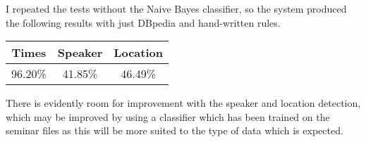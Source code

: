 \documentclass[10pt]{article}
\begin{document}
\begin{multicols}{2}
I repeated the tests without the Naive Bayes classifier, so the system produced the following results with just DBpedia and hand-written rules.
\begin{center}
  \begin{tabular}{| c | c | c |}
    \hline
    Times & Speaker & Location \\ \hline
    96.20\% & 41.85\% & 46.49\% \\ 
    \hline
  \end{tabular}
\end{center}
There is evidently room for improvement with the speaker and location detection, which may be improved by using a classifier which has been trained on the seminar files as this will be more suited to the type of data which is expected.
\end{multicols}
\begin{thebibliography}{9}

\end{thebibliography}
\end{document}
